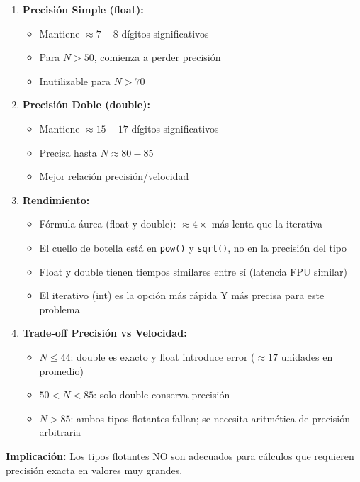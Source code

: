 \documentclass[11pt,a4paper]{article}
\begin{document}
\begin{enumerate}
\item \textbf{Precisión Simple (float):}
\begin{itemize}
    \item Mantiene $\approx 7-8$ dígitos significativos
    \item Para $N > 50$, comienza a perder precisión
    \item Inutilizable para $N > 70$
\end{itemize}

\item \textbf{Precisión Doble (double):}
\begin{itemize}
    \item Mantiene $\approx 15-17$ dígitos significativos
    \item Precisa hasta $N \approx 80-85$
    \item Mejor relación precisión/velocidad
\end{itemize}

\item \textbf{Rendimiento:}
\begin{itemize}
    \item Fórmula áurea (float y double): $\approx 4\times$ más lenta que la iterativa
    \item El cuello de botella está en \texttt{pow()} y \texttt{sqrt()}, no en la precisión del tipo
    \item Float y double tienen tiempos similares entre sí (latencia FPU similar)
    \item El iterativo (int) es la opción más rápida Y más precisa para este problema
\end{itemize}

\item \textbf{Trade-off Precisión vs Velocidad:}
\begin{itemize}
    \item $N \leq 44$: double es exacto y float introduce error ($\approx 17$ unidades en promedio)
    \item $50 < N < 85$: solo double conserva precisión
    \item $N > 85$: ambos tipos flotantes fallan; se necesita aritmética de precisión arbitraria
\end{itemize}
\end{enumerate}

\textbf{Implicación:} Los tipos flotantes NO son adecuados para cálculos que requieren precisión exacta en valores muy grandes.
\end{document}
